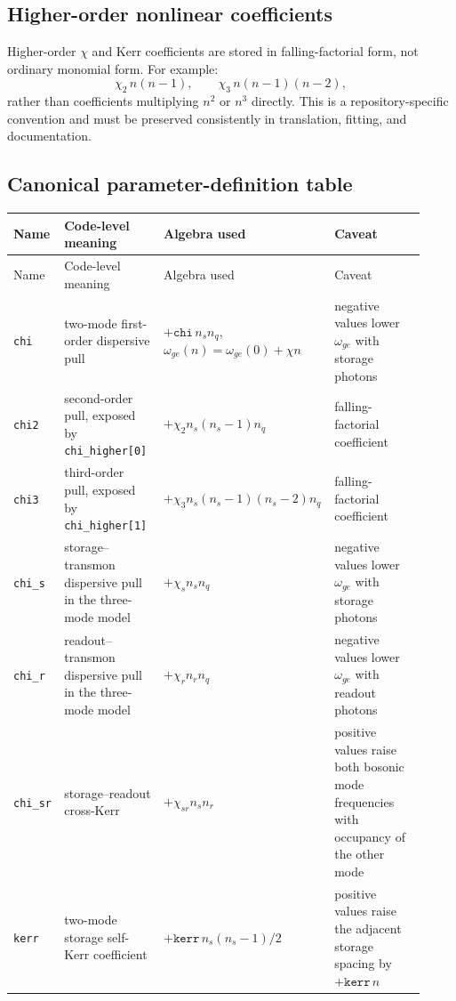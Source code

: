 \documentclass[11pt]{article}
\begin{document}
\subsection*{Higher-order nonlinear coefficients}
Higher-order \(\chi\) and Kerr coefficients are stored in falling-factorial form,
not ordinary monomial form. For example:
\[
\chi_2\, n(n-1),\qquad
\chi_3\, n(n-1)(n-2),
\]
rather than coefficients multiplying \(n^2\) or \(n^3\) directly. This is a
repository-specific convention and must be preserved consistently in translation,
fitting, and documentation.

\subsection*{Canonical parameter-definition table}
\small
\begin{longtable}{p{0.12\linewidth} p{0.24\linewidth} p{0.34\linewidth} p{0.22\linewidth}}
\toprule
Name & Code-level meaning & Algebra used & Caveat \\
\midrule
\endfirsthead
\toprule
Name & Code-level meaning & Algebra used & Caveat \\
\midrule
\endhead
\texttt{chi} & two-mode first-order dispersive pull & \(+\texttt{chi}\, n_s n_q\), \(\omega_{ge}(n)=\omega_{ge}(0)+\chi n\) & negative values lower \(\omega_{ge}\) with storage photons \\
\texttt{chi2} & second-order pull, exposed by \texttt{chi\_higher[0]} & \(+\chi_2 n_s(n_s-1)n_q\) & falling-factorial coefficient \\
\texttt{chi3} & third-order pull, exposed by \texttt{chi\_higher[1]} & \(+\chi_3 n_s(n_s-1)(n_s-2)n_q\) & falling-factorial coefficient \\
\texttt{chi\_s} & storage--transmon dispersive pull in the three-mode model & \(+\chi_s n_s n_q\) & negative values lower \(\omega_{ge}\) with storage photons \\
\texttt{chi\_r} & readout--transmon dispersive pull in the three-mode model & \(+\chi_r n_r n_q\) & negative values lower \(\omega_{ge}\) with readout photons \\
\texttt{chi\_sr} & storage--readout cross-Kerr & \(+\chi_{sr} n_s n_r\) & positive values raise both bosonic mode frequencies with occupancy of the other mode \\
\texttt{kerr} & two-mode storage self-Kerr coefficient & \(+\texttt{kerr}\,n_s(n_s-1)/2\) & positive values raise the adjacent storage spacing by \(+\texttt{kerr}\,n\) \\

\end{longtable}
\end{document}
